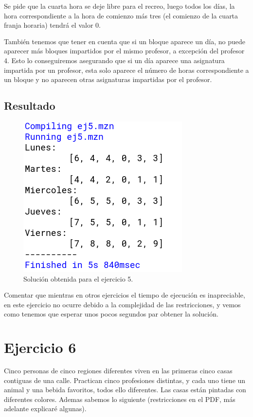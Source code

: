 \documentclass[11pt, spanish]{article}
\begin{document}
Se pide que la cuarta hora se deje libre para el recreo, luego todos los días, la hora correspondiente a la hora de comienzo más tres (el comienzo de la cuarta franja horaria) tendrá el valor 0.

También tenemos que tener en cuenta que si un bloque aparece un día, no puede aparecer más bloques impartidos por el mismo profesor, a excepción del profesor 4. Esto lo conseguiremos asegurando que si un día aparece una asignatura impartida por un profesor, esta solo aparece el número de horas correspondiente a un bloque y no aparecen otras asignaturas impartidas por el profesor.

\subsection{Resultado}


\begin{figure}[H]
  \centering
      \includegraphics[scale = 0.40]{sol5.png}
 		 \caption{Solución obtenida para el ejercicio 5.}
  		\label{fig:ej5}

\end{figure}

Comentar que mientras en otros ejercicios el tiempo de ejecución es inapreciable, en este ejercicio no ocurre debido a la complejidad de las restricciones, y vemos como tenemos que esperar unos pocos segundos par obtener la solución.


\newpage

\section{Ejercicio 6}
Cinco personas de cinco regiones diferentes viven en las primeras cinco casas contiguas de una calle. Practican cinco profesiones distintas, y cada uno tiene un animal y una bebida favoritos, todos ello diferentes. Las casas están pintadas con diferentes colores. Ademas sabemos lo siguiente (restricciones en el PDF, más adelante explicaré algunas).
\end{document}
